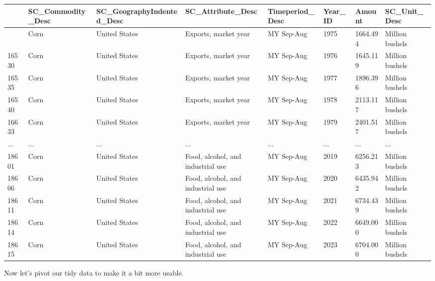 \documentclass[
  letterpaper,
  DIV=11,
  numbers=noendperiod]{scrreprt}
\begin{document}
\begin{longtable}[]{@{}llllllll@{}}
\toprule\noalign{}
& SC\_Commodity\_Desc & SC\_GeographyIndented\_Desc &
SC\_Attribute\_Desc & Timeperiod\_Desc & Year\_ID & Amount &
SC\_Unit\_Desc \\
\midrule\noalign{}
\endhead
\bottomrule\noalign{}
\endlastfoot
16525 & Corn & United States & Exports, market year & MY Sep-Aug & 1975
& 1664.494 & Million bushels \\
16530 & Corn & United States & Exports, market year & MY Sep-Aug & 1976
& 1645.119 & Million bushels \\
16535 & Corn & United States & Exports, market year & MY Sep-Aug & 1977
& 1896.396 & Million bushels \\
16540 & Corn & United States & Exports, market year & MY Sep-Aug & 1978
& 2113.117 & Million bushels \\
16633 & Corn & United States & Exports, market year & MY Sep-Aug & 1979
& 2401.517 & Million bushels \\
... & ... & ... & ... & ... & ... & ... & ... \\
18601 & Corn & United States & Food, alcohol, and industrial use & MY
Sep-Aug & 2019 & 6256.213 & Million bushels \\
18606 & Corn & United States & Food, alcohol, and industrial use & MY
Sep-Aug & 2020 & 6435.942 & Million bushels \\
18611 & Corn & United States & Food, alcohol, and industrial use & MY
Sep-Aug & 2021 & 6734.439 & Million bushels \\
18614 & Corn & United States & Food, alcohol, and industrial use & MY
Sep-Aug & 2022 & 6649.000 & Million bushels \\
18615 & Corn & United States & Food, alcohol, and industrial use & MY
Sep-Aug & 2023 & 6704.000 & Million bushels \\
\end{longtable}

Now let's pivot our tidy data to make it a bit more usable.
\end{document}
